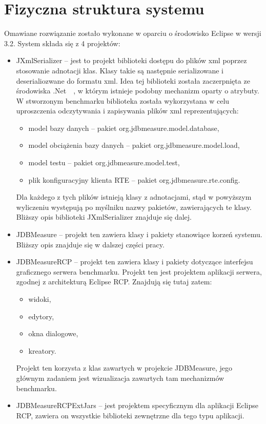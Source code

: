 \section{Fizyczna struktura systemu}
Omawiane rozwiązanie zostało wykonane w oparciu o środowisko Eclipse w wersji 3.2.
System składa się z 4 projektów:
\begin{itemize}
\item JXmlSerializer -- jest to projekt biblioteki dostępu do plików xml poprzez stosowanie adnotacji klas.
Klasy takie są następnie serializowane i deserialiozwane do formatu xml. Idea tej biblioteki została zaczerpnięta
ze środowiska .Net~\cite{.Net1}~\cite{.NetXmlSerializer1}, w którym istnieje podobny mechanizm oparty o atrybuty. 
W stworzonym benchmarku biblioteka została wykorzystana w celu uproszczenia odczytywania i zapisywania plików xml reprezentujących:
\begin{itemize}
\item model bazy danych -- pakiet org.jdbmeasure.model.database,
\item model obciążenia bazy danych -- pakiet org.jdbmeasure.model.load,
\item model testu -- pakiet org.jdbmeasure.model.test,
\item plik konfiguracyjny klienta RTE -- pakiet org.jdbmeasure.rte.config.
\end{itemize}
Dla każdego z tych plików istnieją klasy z adnotacjami, stąd w powyższym wyliczeniu występują po myślniku nazwy pakietów,
zawierających te klasy. Bliższy opis biblioteki JXmlSerializer znajduje się dalej.%
\item JDBMeasure -- projekt ten zawiera klasy i pakiety stanowiące korzeń systemu. Bliższy opis znajduje się w dalszej części pracy.
\item JDBMeasureRCP -- projekt ten zawiera klasy i pakiety dotyczące interfejsu graficznego serwera benchmarku. Projekt ten
jest projektem aplikacji serwera, zgodnej z architekturą Eclipse RCP. Znajdują się tutaj zatem:
\begin{itemize}
\item widoki,
\item edytory,
\item okna dialogowe,
\item kreatory.
\end{itemize}
Projekt ten korzysta z klas zawartych w projekcie JDBMeasure, jego głównym zadaniem jest wizualizacja zawartych tam mechanizmów benchmarku.
\item JDBMeasureRCPExtJars -- jest projektem specyficznym dla aplikacji Eclipse RCP, zawiera on wszystkie biblioteki zewnętrzne dla tego typu aplikacji.

\end{itemize}
